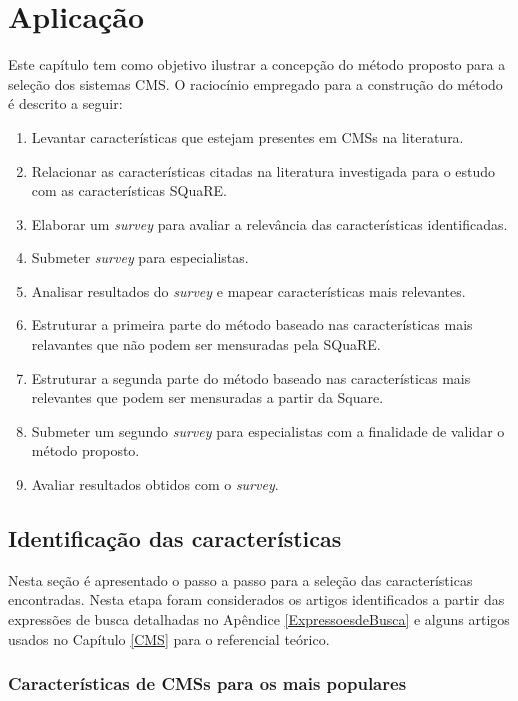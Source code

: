 \chapter[Aplicação] {Aplicação}
\label{aplicação}

Este capítulo tem como objetivo ilustrar a concepção do método proposto para a seleção dos sistemas CMS. O raciocínio empregado para a construção do método é descrito a seguir:

\begin{enumerate}
\item Levantar características que estejam presentes em CMSs na literatura.

\item Relacionar as características citadas na literatura investigada para o estudo com as características SQuaRE.

\item Elaborar um \textit{survey} para avaliar a relevância das características identificadas.

\item Submeter \textit{survey} para especialistas.
\item Analisar resultados do \textit{survey} e mapear características mais relevantes.
\item Estruturar a primeira parte do método baseado nas características mais relavantes que não podem ser mensuradas pela SQuaRE.
\item  Estruturar a segunda parte do método baseado nas características mais relevantes que podem ser mensuradas a partir da Square.
\item Submeter um segundo \textit{survey} para especialistas com a finalidade de validar o método proposto.
\item Avaliar resultados obtidos com o \textit{survey}.
\end{enumerate}




\section{Identificação das  características}
\label{Levantamento_de_características}
Nesta seção é apresentado o passo a passo para a seleção das características encontradas. Nesta etapa foram considerados os artigos identificados a partir das expressões de busca detalhadas no Apêndice  \ref{ExpressoesdeBusca} e alguns artigos usados no Capítulo \ref{CMS} para o referencial teórico.  

\subsection{Características de CMSs para os mais populares}
\label{mapeamento_populares}

